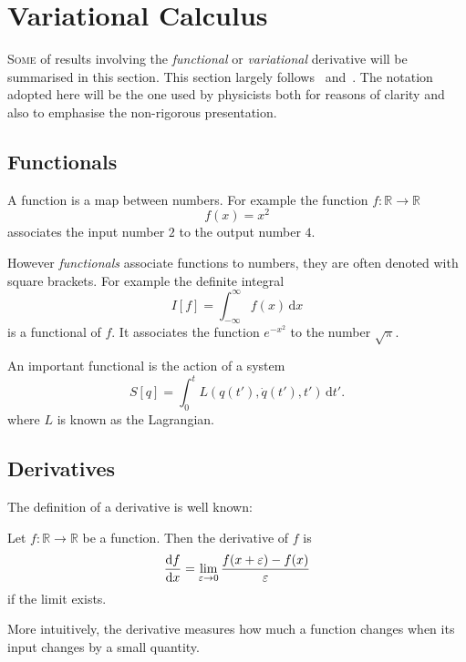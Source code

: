 \chapter{Variational Calculus}
\label{appendix:variational_calculus}

\lettrine[lines=3,loversize=0.1,findent=0.1em,nindent=0em]{S}{ome} of results involving the \emph{functional} or \emph{variational} derivative will be summarised in this section.
This section largely follows~\cite{Lancaster2014} and~\cite{Goldenfeld1992}. The notation adopted here will be the one used by physicists
both for reasons of clarity and also to emphasise the non-rigorous presentation.

\section{Functionals}
A function is a map between numbers. For example the function $f\colon \mathbb{R} \rightarrow \mathbb{R}$
\begin{equation}
  \label{eq:example_function}
  f(x) = x^2
\end{equation}
associates the input number $2$ to the output number $4$.

However \emph{functionals} associate functions to numbers, they are often denoted with square brackets. For example
the definite integral
\begin{equation}
  \label{eq:example_functional_definite_integral}
  I[f] = \int_{-\infty}^{\infty} f(x) \, \mathrm{d}x
\end{equation}
is a functional of $f$. It associates the function $e^{-x^2}$ to the number $\sqrt{\pi}$.

An important functional is the action of a system
\begin{equation}
  \label{eq:example_functional_action}
  S[q] = \int_0^t L(q(t'),\dot{q}(t'),t')\,\mathrm{d}t'.
\end{equation}
where $L$ is known as the Lagrangian.


\section{Derivatives}
The definition of a derivative is well known:
\begin{definition}
  \label{definition:derivative}
  Let $f\colon \mathbb{R} \rightarrow \mathbb{R}$ be a function. Then the derivative of $f$ is
  \begin{equation}
    \label{eq:definition_of_derivative}
    \dv{f}{x} = \lim_{\varepsilon\rightarrow 0} \frac{f(x + \varepsilon) - f(x)}{\varepsilon}
  \end{equation}
  if the limit exists.
\end{definition}
More intuitively, the derivative measures how much a function changes when its input changes by a small quantity.

